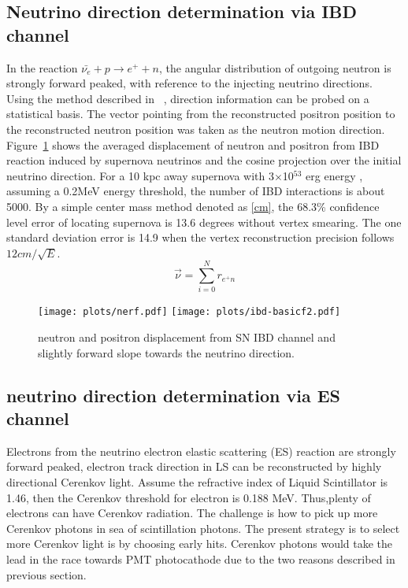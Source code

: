 \documentclass[a4paper,10pt]{cpc-hepnp}
\begin{document}
\subsection{ Neutrino direction determination via IBD channel}
\label{sec:intro}
In the reaction $\bar{\nu_{e}}+p \rightarrow e^{+}+n$, the
angular distribution of outgoing neutron is strongly forward peaked, with
reference to the injecting neutrino directions. Using the method described in
~\cite{chooz}, direction information can be probed on a  statistical basis.
The vector pointing from the reconstructed positron position to the
reconstructed neutron position was taken as the neutron motion direction.
Figure~\ref{ibd-basicplot} shows the averaged displacement of neutron and
positron from IBD reaction induced by supernova neutrinos and the cosine
projection over the initial neutrino direction.
For a 10 kpc away supernova with 3$\times$10$^53$ erg energy , assuming a 
0.2MeV energy threshold, the number of IBD interactions is about 5000.
By a simple center mass method denoted as \eqref{cm},
the 68.3\% confidence level error of locating supernova is 13.6 degrees without
vertex smearing. The one standard deviation error is 14.9 when the vertex
reconstruction precision follows $12cm/\sqrt{E}$.
\begin{equation}
\label{cm}
\vec{\nu} = \sum_{i=0}^{N}r_{e^{+}n}
\end{equation}

\begin{figure}[htbp]
\centering %
\texttt{[image: plots/nerf.pdf]}
\hfill
\texttt{[image: plots/ibd-basicf2.pdf]}
\caption{\label{ibd-basicplot} neutron and positron displacement from SN IBD
channel and slightly forward slope towards the neutrino direction.}
\end{figure}

\subsection{neutrino direction determination via ES channel}
Electrons from the neutrino electron elastic scattering (ES) reaction are
strongly forward peaked, electron track direction in LS can be reconstructed
by highly directional Cerenkov light. Assume the refractive index of Liquid 
Scintillator is 1.46, then the Cerenkov threshold for electron is 0.188 MeV.
Thus,plenty of electrons can have Cerenkov radiation. The challenge is how 
to pick up more Cerenkov photons in sea of scintillation photons. 
The present strategy is to select more Cerenkov light is by choosing early hits. 
Cerenkov photons would take the lead in the race towards PMT photocathode due
to the two reasons described in previous section. 
\end{document}
